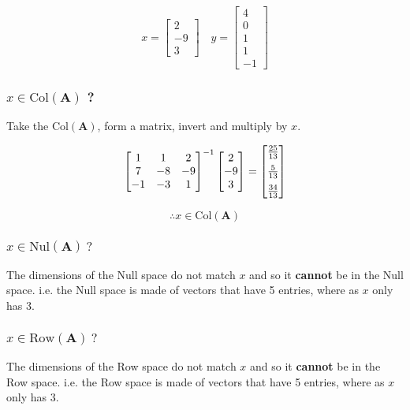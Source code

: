 \documentclass{article}
\begin{document}
\[%
    x 
    =
    \begin{bmatrix} 2\\-9\\3 \end{bmatrix}
    \quad
    y
    =
    \begin{bmatrix} 4\\0\\1\\1\\-1 \end{bmatrix}
\]%

\subsubsection{$ x \in \text{Col}(\mathbf{A}) $ ?} 

Take the $\text{Col}(\mathbf{A})$, form a matrix, invert and multiply by $x$. 

\[%
    \begin{bmatrix} 
        1&1&2\\ 
        7&-8&-9\\ 
        -1&-3&1\\ 
    \end{bmatrix}^{-1}
    \begin{bmatrix} 2\\-9\\3 \end{bmatrix}
    =
    \begin{bmatrix} \frac{25}{13} \vspace{2mm}\\ \frac{5}{13} \vspace{2mm} \\ \frac{34}{13}  \end{bmatrix}
\]%

$$\therefore x \in \text{Col}(\mathbf{A})$$

\subsubsection{$ x \in \text{Nul}(\mathbf{A}) \ ?$}
The dimensions of the Null space do not match $x$ and so it \textbf{cannot} be in the
Null space. i.e. the Null space is made of vectors that have 5 entries, where as 
$x$ only has 3.

\subsubsection{$ x \in \text{Row}(\mathbf{A}) \ ?$}
The dimensions of the Row space do not match $x$ and so it \textbf{cannot} be in the
Row space. i.e. the Row space is made of vectors that have 5 entries, where as
$x$ only has 3.
\end{document}

